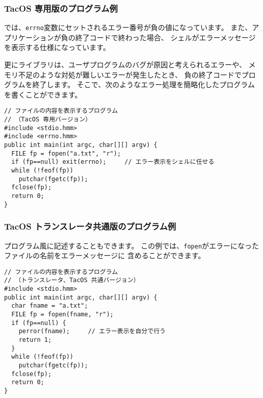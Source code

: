 \subsubsection{TacOS 専用版のプログラム例}

\tacos では、\verb/errno/変数にセットされるエラー番号が負の値になっています。
また、アプリケーションが負の終了コードで終わった場合、
シェルがエラーメッセージを表示する仕様になっています。

更にライブラリは、ユーザプログラムのバグが原因と考えられるエラーや、
メモリ不足のような対処が難しいエラーが発生したとき、
負の終了コードでプログラムを終了します。
そこで、次のようなエラー処理を簡略化したプログラムを書くことができます。


\begin{mylist}
\begin{verbatim}
// ファイルの内容を表示するプログラム
// （TacOS 専用バージョン）
#include <stdio.hmm>
#include <errno.hmm>
public int main(int argc, char[][] argv) {
  FILE fp = fopen("a.txt", "r");
  if (fp==null) exit(errno);     // エラー表示をシェルに任せる
  while (!feof(fp))
    putchar(fgetc(fp));
  fclose(fp);
  return 0;
}
\end{verbatim}
\end{mylist}

\subsubsection{TacOS トランスレータ共通版のプログラム例}

\cl プログラム風に記述することもできます。
この例では、\verb/fopen/がエラーになったファイルの名前をエラーメッセージに
含めることができます。

\begin{mylist}
\begin{verbatim}
// ファイルの内容を表示するプログラム
// （トランスレータ、TacOS 共通バージョン）
#include <stdio.hmm>
public int main(int argc, char[][] argv) {
  char fname = "a.txt";
  FILE fp = fopen(fname, "r");
  if (fp==null) {
    perror(fname);     // エラー表示を自分で行う
    return 1;
  }
  while (!feof(fp))
    putchar(fgetc(fp));
  fclose(fp);
  return 0;
}
\end{verbatim}
\end{mylist}

